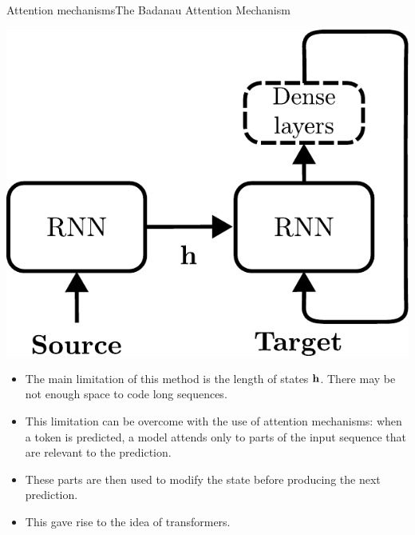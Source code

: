 \documentclass{beamer}
\begin{document}
\begin{frame}{Attention mechanisms}{The Badanau Attention Mechanism}
\begin{multicols}{2}
\begin{center}
\includegraphics[scale=0.3]{Module 6 (Attention-based networks)/pics/sequence_translate_RNN_compact.pdf}
\end{center}
\columnbreak
\begin{itemize}
\item The main limitation of this method is the length of states ${\bf h}$. There may be not enough space to code long sequences. 
\end{itemize}  

\end{multicols}
\begin{itemize}
    \item This limitation can be overcome with the use of attention mechanisms: when a token is predicted, a model attends only to parts of the input sequence that are relevant to the prediction. 
    \item These parts are then used to modify the state before producing the next prediction.
    \item This gave rise to the idea of transformers. 
\end{itemize}
\end{frame}
\end{document}
